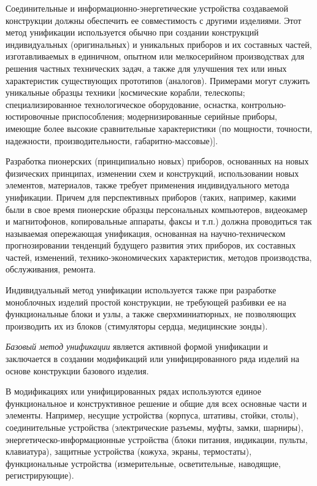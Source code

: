 \begin{enumerate}
Соединительные и информационно-энергетические устройства создаваемой конструкции должны обеспечить ее совместимость с другими изделиями.
Этот метод унификации используется обычно при создании конструкций индивидуальных (оригинальных) и уникальных приборов и их составных частей, изготавливаемых в единичном, опытном или мелкосерийном производствах для решения частных технических задач, а также для улучшения тех или иных характеристик существующих прототипов (аналогов). Примерами могут служить уникальные образцы техники [космические корабли, телескопы; специализированное технологическое оборудование, оснастка, контрольно-юстировочные приспособления; модернизированные серийные приборы, имеющие более высокие сравнительные характеристики (по мощности, точности, надежности, производительности, габаритно-массовые)].

Разработка пионерских (принципиально новых) приборов, основанных на новых физических принципах, изменении схем и конструкций, использовании новых элементов, материалов, также требует применения индивидуального метода унификации. Причем для перспективных приборов (таких, например, какими были в свое время пионерские образцы персональных компьютеров, видеокамер и магнитофонов, копировальные аппараты, факсы и т.п.) должна проводиться так называемая опережающая унификация, основанная на научно-техническом прогнозировании тенденций будущего развития этих приборов, их составных частей, изменений, технико-экономических характеристик, методов производства, обслуживания, ремонта.

Индивидуальный метод унификации используется также при разработке моноблочных изделий простой конструкции, не требующей разбивки ее на функциональные блоки и узлы, а также сверхминиатюрных, не позволяющих производить их из блоков (стимуляторы сердца, медицинские зонды).

\textit{Базовый метод унификации} является активной формой унификации и заключается в создании модификаций или унифицированного ряда изделий на основе конструкции базового изделия.

В модификациях или унифицированных рядах используются единое функциональное и конструктивное решение и общие для всех основные части и элементы. Например, несущие устройства (корпуса, штативы, стойки, столы), соединительные устройства (электрические разъемы, муфты, замки, шарниры), энергетическо-информационные устройства (блоки питания, индикации, пульты, клавиатура), защитные устройства (кожуха, экраны, термостаты), функциональные устройства (измерительные, осветительные, наводящие, регистрирующие).


\end{enumerate}

